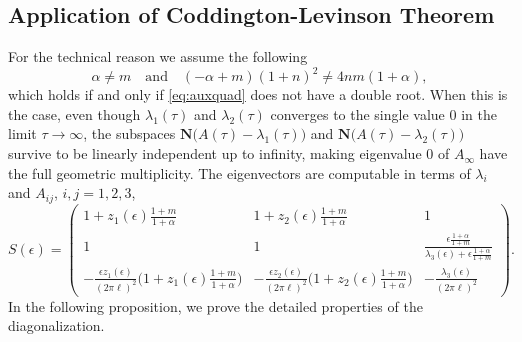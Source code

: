 \documentclass[a4paper,11pt]{article}
\def\l{(2\pi \ell)}
\theoremstyle{remark}
\begin{document}
\subsection{Application of Coddington-Levinson Theorem}
For the technical reason we assume the following
 \begin{equation}
  \alpha\ne m \quad \text{and} \quad (-\alpha+m)(1+n)^2 \ne 4nm(1+\alpha), \tag{$A0$} \label{eq:nodoubleroot}
\end{equation}
which holds if and only if \eqref{eq:auxquad} does not have a double root.
When this is the case, even though $\lambda_1(\tau)$ and $\lambda_2(\tau)$ converges to the single value $0$ in the limit $\tau \rightarrow \infty$, the subspaces $\mathbf{N}\Big(A(\tau)-\lambda_1(\tau)\Big)$ and  $\mathbf{N}\Big(A(\tau)-\lambda_2(\tau)\Big)$ survive to be linearly independent up to infinity, making eigenvalue $0$ of $A_\infty$ have the full geometric multiplicity. The eigenvectors are computable in terms of $\lambda_{i}$ and $A_{ij}$, $i,j=1,2,3$,
\begin{equation}
S(\epsilon) =   \begin{pmatrix}
    1 + z_1(\epsilon)\frac{1+m}{1+\alpha} & 1 + z_2(\epsilon)\frac{1+m}{1+\alpha} & 1\\
    1 & 1 & \frac{\epsilon \tfrac{1+\alpha}{1+m}}{\lambda_3(\epsilon) + \epsilon\tfrac{1+\alpha}{1+m}}\\
    -\frac{\epsilon z_1(\epsilon)}{\l^2}\Big(1 + z_1(\epsilon)\frac{1+m}{1+\alpha}\Big) & -\frac{\epsilon z_2(\epsilon)}{\l^2}\Big(1 + z_2(\epsilon)\frac{1+m}{1+\alpha}\Big) & -\frac{\lambda_3(\epsilon)}{\l^2}
   \end{pmatrix}. \label{eq:S}
\end{equation}
In the following proposition, we prove the detailed properties of the diagonalization. %
\end{document}
